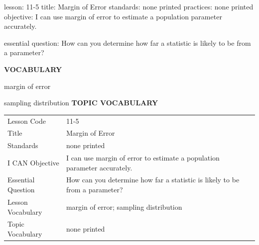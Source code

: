 \documentclass{article}
\newenvironment{lesson-meta}{}{}        %
\newcommand{\te}[1]{}                   %
\begin{document}
\begin{lesson-meta}
lesson: 11-5
title: Margin of Error
standards: none printed
practices: none printed
objective: I can use margin of error to estimate a population parameter accurately.

essential question: How can you determine how far a statistic is likely to be from a parameter?

\textbf{VOCABULARY}
\item margin of error
\item sampling distribution
\textbf{TOPIC VOCABULARY}
\te{No separate topic vocabulary list is printed on these pages.}
\begin{tabular}{ll}
Lesson Code & 11-5 \\
Title & Margin of Error \\
Standards & none printed \\
I CAN Objective & I can use margin of error to estimate a population parameter accurately. \\
Essential Question & How can you determine how far a statistic is likely to be from a parameter? \\
Lesson Vocabulary & margin of error; sampling distribution \\
Topic Vocabulary & none printed \\
\end{tabular}
\end{lesson-meta}
\end{document}
